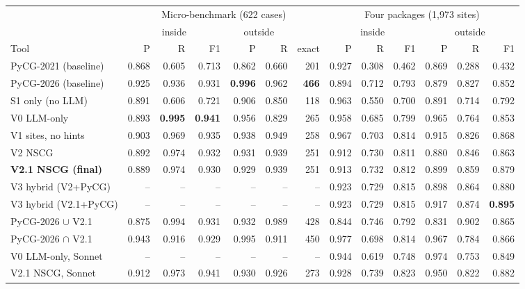 \begin{tabular}{l rrr rr r rrr rrr}
\toprule
& \multicolumn{6}{c}{Micro-benchmark (622 cases)} & \multicolumn{6}{c}{Four packages (1,973 sites)}\\
\cmidrule(lr){2-7}\cmidrule(lr){8-13}
& \multicolumn{3}{c}{inside} & \multicolumn{2}{c}{outside} & & \multicolumn{3}{c}{inside} & \multicolumn{3}{c}{outside}\\
\cmidrule(lr){2-4}\cmidrule(lr){5-6}\cmidrule(lr){8-10}\cmidrule(lr){11-13}
Tool & P & R & F1 & P & R & exact & P & R & F1 & P & R & F1\\
\midrule
PyCG-2021 (baseline) & 0.868 & 0.605 & 0.713 & 0.862 & 0.660 & 201 & 0.927 & 0.308 & 0.462 & 0.869 & 0.288 & 0.432 \\
PyCG-2026 (baseline) & 0.925 & 0.936 & 0.931 & \textbf{0.996} & 0.962 & \textbf{466} & 0.894 & 0.712 & 0.793 & 0.879 & 0.827 & 0.852 \\
\midrule
S1 only (no LLM) & 0.891 & 0.606 & 0.721 & 0.906 & 0.850 & 118 & 0.963 & 0.550 & 0.700 & 0.891 & 0.714 & 0.792 \\
V0 LLM-only & 0.893 & \textbf{0.995} & \textbf{0.941} & 0.956 & 0.829 & 265 & 0.958 & 0.685 & 0.799 & 0.965 & 0.764 & 0.853 \\
V1 sites, no hints & 0.903 & 0.969 & 0.935 & 0.938 & 0.949 & 258 & 0.967 & 0.703 & 0.814 & 0.915 & 0.826 & 0.868 \\
V2 NSCG & 0.892 & 0.974 & 0.932 & 0.931 & 0.939 & 251 & 0.912 & 0.730 & 0.811 & 0.880 & 0.846 & 0.863 \\
\textbf{V2.1 NSCG (final)} & 0.889 & 0.974 & 0.930 & 0.929 & 0.939 & 251 & 0.913 & 0.732 & 0.812 & 0.899 & 0.859 & 0.879 \\
V3 hybrid (V2+PyCG) & -- & -- & -- & -- & -- & -- & 0.923 & 0.729 & 0.815 & 0.898 & 0.864 & 0.880 \\
V3 hybrid (V2.1+PyCG) & -- & -- & -- & -- & -- & -- & 0.923 & 0.729 & 0.815 & 0.917 & 0.874 & \textbf{0.895} \\
\midrule
PyCG-2026 $\cup$ V2.1 & 0.875 & 0.994 & 0.931 & 0.932 & 0.989 & 428 & 0.844 & 0.746 & 0.792 & 0.831 & 0.902 & 0.865 \\
PyCG-2026 $\cap$ V2.1 & 0.943 & 0.916 & 0.929 & 0.995 & 0.911 & 450 & 0.977 & 0.698 & 0.814 & 0.967 & 0.784 & 0.866 \\
\midrule
V0 LLM-only, Sonnet & -- & -- & -- & -- & -- & -- & 0.944 & 0.619 & 0.748 & 0.974 & 0.753 & 0.849 \\
V2.1 NSCG, Sonnet & 0.912 & 0.973 & 0.941 & 0.930 & 0.926 & 273 & 0.928 & 0.739 & 0.823 & 0.950 & 0.822 & 0.882 \\
\bottomrule
\end{tabular}
